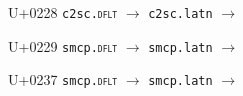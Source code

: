 \documentclass{article}
\begin{document}
\begin{substitutions}
\goodbreak

U+0228  \linebreak
    \texttt{c2sc.\textsc{dflt}} $\to$  \linebreak
    \texttt{c2sc.latn} $\to$  

\goodbreak

U+0229  \linebreak
    \texttt{smcp.\textsc{dflt}} $\to$  \linebreak
    \texttt{smcp.latn} $\to$  

\goodbreak

U+0237  \linebreak
    \texttt{smcp.\textsc{dflt}} $\to$  \linebreak
    \texttt{smcp.latn} $\to$  

\goodbreak

\end{substitutions}

\clearpage
\end{document}
